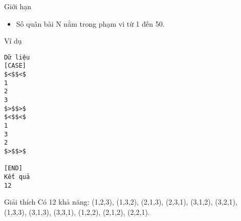 Giới hạn  
\begin{itemize}
	\item     Số quân bài N nằm trong phạm vi từ 1 đến 50.   
\end{itemize}
   Ví dụ  
\begin{verbatim}
Dữ liệu
[CASE]
$<$$<$
1
2 
3
$>$$>$
$<$$<$
1 
3
2
$>$$>$

[END]
Kết quả
12
\end{verbatim}
   Giải thích  
Có 12 khả năng: (1,2,3), (1,3,2), (2,1,3), (2,3,1), (3,1,2), (3,2,1), (1,3,3), (3,1,3), (3,3,1), (1,2,2), (2,1,2), (2,2,1).